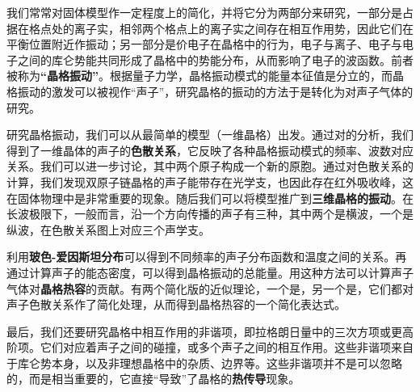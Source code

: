 
我们常常对固体模型作一定程度上的简化，并将它分为两部分来研究，一部分是占据在格点处的离子实，相邻两个格点上的离子实之间存在相互作用势，因此它们在平衡位置附近作振动；另一部分是价电子在晶格中的行为，电子与离子、电子与电子之间的库仑势能共同形成了晶格中的势能分布，从而影响了电子的波函数。前者被称为\textbf{“晶格振动”}。根据量子力学，晶格振动模式的能量本征值是分立的，而晶格振动的激发可以被视作“声子”，研究晶格的振动的方法于是转化为对声子气体的研究。

研究晶格振动，我们可以从最简单的模型（一维晶格）出发。通过对的分析，我们得到了一维晶体的声子的\textbf{色散关系}，它反映了各种晶格振动模式的频率、波数对应关系。我们可以进一步讨论，其中两个原子构成一个新的原胞。通过对色散关系的计算，我们发现双原子链晶格的声子能带存在光学支，也因此存在红外吸收峰，这在固体物理中是非常重要的现象。随后我们可以将模型推广到\textbf{三维晶格的振动}。在长波极限下，一般而言，沿一个方向传播的声子有三种，其中两个是横波，一个是纵波，在色散关系图上对应三个声学支。

利用\textbf{玻色-爱因斯坦分布}可以得到不同频率的声子分布函数和温度之间的关系。再通过计算声子的能态密度，可以得到晶格振动的总能量。用这种方法可以计算声子气体对\textbf{晶格热容}的贡献。有两个简化版的近似理论，一个是，另一个是，它们都对声子色散关系作了简化处理，从而得到晶格热容的一个简化表达式。

最后，我们还要研究晶格中相互作用的非谐项，即拉格朗日量中的三次方项或更高阶项。它们对应着声子之间的碰撞，或多个声子之间的相互作用。这些非谐项来自于库仑势本身，以及非理想晶格中的杂质、边界等。这些非谐项并不是可以忽略的，而是相当重要的，它直接“导致”了晶格的\textbf{热传导}现象。
